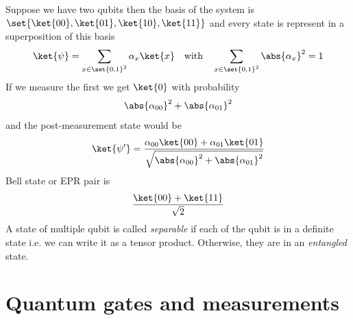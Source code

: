 Suppose we have two qubits then the basis of the system is \(\set{\ket{00}, \ket{01} , \ket{10} , \ket{11}}\) and every state is represent in a superposition of this basis
\begin{equation*}
    \ket{\psi} = \sum_{x \in \set{0,1}^2} \alpha_x \ket{x} \quad \text{with} \quad \sum_{x \in \set{0,1}^2} \abs{\alpha_x}^2 = 1
\end{equation*}
If we measure the first we get \(\ket{0}\) with probability 
\begin{equation*}
    \abs{\alpha_{00}}^2 + \abs{\alpha_{01}}^2 
\end{equation*}
and the post-measurement state would be 
\begin{equation*}
    \ket{\psi'} = \dfrac{\alpha_{00} \ket{00} + \alpha_{01} \ket{01}}{\sqrt{\abs{\alpha_{00}}^2 + \abs{\alpha_{01}}^2}}
\end{equation*}
Bell state or EPR pair is 
\begin{equation*}
    \dfrac{\ket{00} + \ket{11}}{\sqrt{2}}
\end{equation*}
A state of multiple qubit is called \textit{separable} if each of the qubit is in a definite state i.e. we can write it as a tensor product. Otherwise, they are in an \textit{entangled} state.


\section{Quantum gates and measurements}

